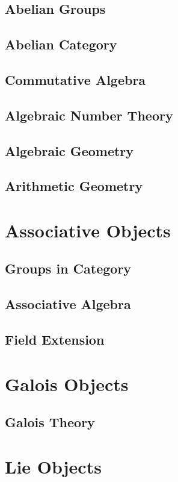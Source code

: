 \chapter{Abelian Groups}
\chapter{Abelian Category}
\chapter{Commutative Algebra}
\chapter{Algebraic Number Theory}
\chapter{Algebraic Geometry}
\chapter{Arithmetic Geometry}

\part{Associative Objects}
\chapter{Groups in Category}

\chapter{Associative Algebra}

\chapter{Field Extension}


\part{Galois Objects}
\chapter{Galois Theory}

\part{Lie Objects}

